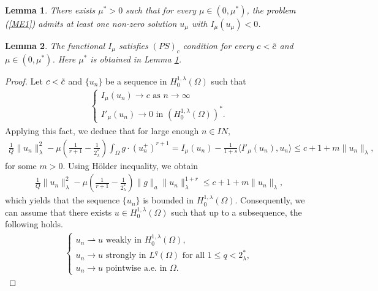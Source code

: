 \documentclass[10pt,a4paper]{amsart}
\newtheorem{lem}{Lemma}
\def\N{{I\!\!N}}
\begin{document}
\begin{lem}\label{Fsol}
     There exists $\mu^*>0$ such that for every $\mu\in(0,\mu^*)$, the \textcolor{black}{problem (\ref{ME1})} admits at least one non-zero solution $u_\mu$ with $I_\mu(u_\mu)<0$.
\end{lem}

\begin{lem}\label{BrezisNiren1}
     The functional $I_\mu$ satisfies $(PS)_c$ condition for every $c<\Tilde{c}$ and $\mu\in(0,\mu^*)$. Here $\mu^*$ is obtained in Lemma \ref{Fsol}.
\end{lem}

\begin{proof}
Let $c<\Tilde{c}$ and $\{u_n\}$ be a sequence in $H^{1,\lambda}_0(\Omega)$ such that 
\begin{align}\label{W5}
    \begin{cases}
        I_\mu(u_n)\to c \text{ as } n\to\infty\\
        I'_\mu(u_n)\to 0 \text{ in } (H^{1,\lambda}_0(\Omega))^*.
    \end{cases}
\end{align}
Applying this fact, we deduce that for large enough $n\in\N,$
\begin{align*}
    \frac{1}{Q}\|u_n\|^2_\lambda-\mu\left (\frac{1}{r+1}-\frac{1}{2^*_\lambda}\right )\int_\Omega g\cdot(u_n^+)^{r+1}=I_\mu(u_n)-\frac{1}{1+s}\langle I'_\mu(u_n),u_n\rangle\leq c+1+m\|u_n\|_\lambda,
    \end{align*}
  for some $m>0$. Using H\"{o}lder inequality, we obtain
    \begin{align}\label{BDD}
         \frac{1}{Q}\|u_n\|_\lambda^2-\mu\left (\frac{1}{r+1}-\frac{1}{2^*_\lambda}\right )\|g\|_a\|u_n\|_\lambda^{1+r}\leq c+1+m\|u_n\|_\lambda,
    \end{align}
   which yields that the sequence $\{u_n\}$ is bounded in $H^{1,\lambda}_0(\Omega)$. Consequently, we can assume that there exists $u\in H^{1,\lambda}_0(\Omega)$ such that up to a subsequence, the following holds.
   \begin{align}\label{Lab}
        \begin{cases}
       u_n\rightharpoonup u \text{ weakly in }H^{1,\lambda}_0(\Omega),\\
        u_n\to u \text{ strongly in } L^{q}(\Omega) \text{ for all }1\leq q< 2^*_\lambda,\\
        u_n\to u \text{ pointwise a.e. in }\Omega.
    \end{cases}
   \end{align}

\end{proof}
\end{document}
